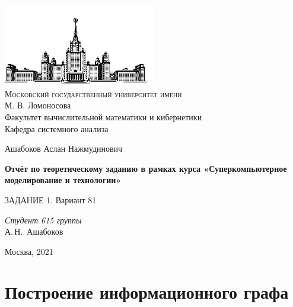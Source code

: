 \documentclass[a4paper, 12pt]{article}
\begin{document}
\thispagestyle{empty}

\begin{center}
\vspace{-3cm}
\includegraphics[width=0.5\textwidth]{src/msu.png}\\
{\scshape Московский государственный университет имени}\\
М. В. Ломоносова\\
Факультет вычислительной математики и кибернетики\\
Кафедра системного анализа

\vfill

{\LARGE Ашабоков Аслан Нажмудинович}

\vspace{1cm}

{\Huge\bfseries Отчёт по теоретическому заданию в рамках курса
«Суперкомпьютерное моделирование и технологии»}\\

\vspace{1cm}

{\LARGE ЗАДАНИЕ 1. Вариант 81}
\end{center}

\vspace{1cm}

\begin{flushright}
  \large
  \textit{Студент 615 группы}\\
  А.\,Н.~Ашабоков

  \vspace{5mm}

\end{flushright}

\vfill

\begin{center}
Москва, 2021
\end{center}

\newpage
\setcounter{tocdepth}{2}
\tableofcontents

\newpage
\normalsize

\section{Построение информационного графа}
\end{document}

